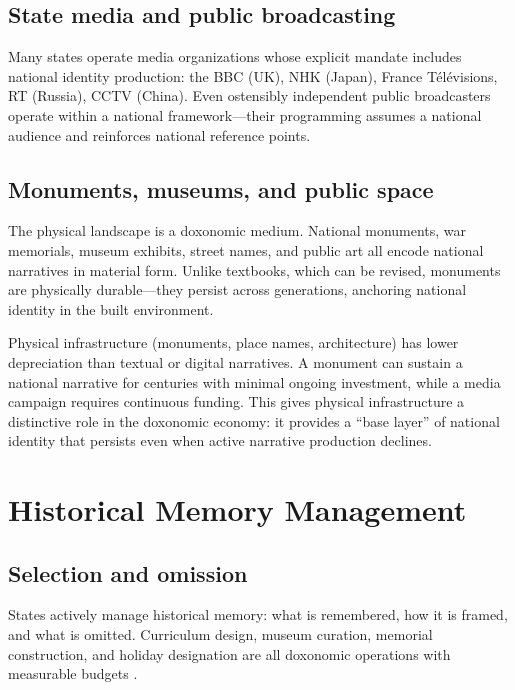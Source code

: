 \subsection{State media and public broadcasting}

Many states operate media organizations whose explicit mandate includes national identity production: the BBC (UK), NHK (Japan), France T\'{e}l\'{e}visions, RT (Russia), CCTV (China).
Even ostensibly independent public broadcasters operate within a national framework---their programming assumes a national audience and reinforces national reference points.

\subsection{Monuments, museums, and public space}

The physical landscape is a doxonomic medium.
National monuments, war memorials, museum exhibits, street names, and public art all encode national narratives in material form.
Unlike textbooks, which can be revised, monuments are physically durable---they persist across generations, anchoring national identity in the built environment.

\begin{proposition}
\label{prop:material-persistence}
Physical infrastructure (monuments, place names, architecture) has lower depreciation than textual or digital narratives.
A monument can sustain a national narrative for centuries with minimal ongoing investment, while a media campaign requires continuous funding.
This gives physical infrastructure a distinctive role in the doxonomic economy: it provides a ``base layer'' of national identity that persists even when active narrative production declines.
\end{proposition}

\section{Historical Memory Management}
\label{sec:ch27-memory}

\subsection{Selection and omission}

States actively manage historical memory: what is remembered, how it is framed, and what is omitted.
Curriculum design, museum curation, memorial construction, and holiday designation are all doxonomic operations with measurable budgets \autocite{anderson2006}.

